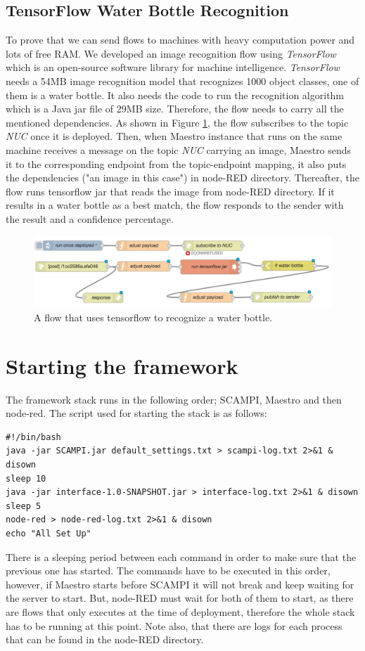 \subsection{TensorFlow Water Bottle Recognition} \label{subsec:tensor}
To prove that we can send flows to machines with heavy computation power and lots of free RAM. We developed an image recognition flow using \textit{TensorFlow} which is an open-source software library for machine intelligence. \textit{TensorFlow} needs a 54MB image recognition model that recognizes 1000 object classes, one of them is a water bottle. It also needs the code to run the recognition algorithm which is a Java jar file of 29MB size. Therefore, the flow  needs to carry all the mentioned dependencies. As shown in Figure \ref{fig:flow-tensor}, the flow subscribes to the topic \textit{NUC} once it is deployed. Then, when Maestro instance that runs on the same machine receives a message on the topic \textit{NUC} carrying an image, Maestro sends it to the corresponding endpoint  from the topic-endpoint mapping, it also puts the dependencies ("an image in this case") in node-RED directory. Thereafter, the flow runs tensorflow jar that reads the image from  node-RED directory. If it results in a water bottle as a best match, the flow responds to the sender with the result and a confidence percentage.
 \begin{figure}[H]
	\centering
	\includegraphics[scale=0.6]{images/flow-tensor.png}
	\caption{A flow that uses tensorflow to recognize a water bottle.}
	\label{fig:flow-tensor}
\end{figure} 

\section{Starting the framework}\label{subsec:starting-framework}

The framework stack runs in the following order; SCAMPI, Maestro and then node-red. The script used for starting the stack is as follows:
\begin{verbatim}
#!/bin/bash
java -jar SCAMPI.jar default_settings.txt > scampi-log.txt 2>&1 & disown
sleep 10
java -jar interface-1.0-SNAPSHOT.jar > interface-log.txt 2>&1 & disown
sleep 5
node-red > node-red-log.txt 2>&1 & disown
echo "All Set Up"
\end{verbatim}
There is a sleeping period between each command in order to make sure that the previous one has started. The commands have to be executed in this order, however, if Maestro starts before SCAMPI it will not break and keep waiting for the server to start. But, node-RED must wait for both of them to start, as there are flows that only executes at the time of deployment, therefore the whole stack has to be running at this point. Note also, that there are logs for each process that can be found in the node-RED directory. 


